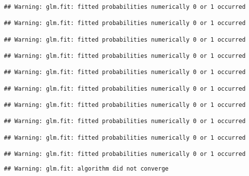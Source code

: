 \documentclass[
]{article}
\begin{document}
\begin{verbatim}
## Warning: glm.fit: fitted probabilities numerically 0 or 1 occurred

## Warning: glm.fit: fitted probabilities numerically 0 or 1 occurred

## Warning: glm.fit: fitted probabilities numerically 0 or 1 occurred

## Warning: glm.fit: fitted probabilities numerically 0 or 1 occurred

## Warning: glm.fit: fitted probabilities numerically 0 or 1 occurred

## Warning: glm.fit: fitted probabilities numerically 0 or 1 occurred

## Warning: glm.fit: fitted probabilities numerically 0 or 1 occurred

## Warning: glm.fit: fitted probabilities numerically 0 or 1 occurred

## Warning: glm.fit: fitted probabilities numerically 0 or 1 occurred

## Warning: glm.fit: fitted probabilities numerically 0 or 1 occurred
\end{verbatim}

\begin{verbatim}
## Warning: glm.fit: algorithm did not converge
\end{verbatim}
\end{document}
